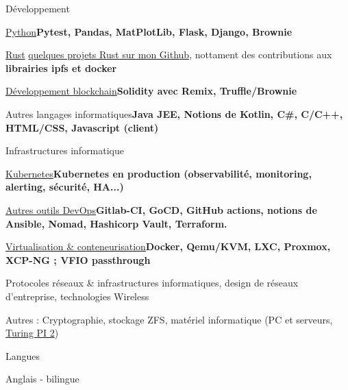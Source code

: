 \begin{cventries}
  \cventry
    {} %
    {Développement} %
    {} %
    {} %
    {
      \begin{cvitems} %
        \item {\underline{Python}\hspace{4.8cm}\textbf{Pytest, Pandas, MatPlotLib, Flask, Django, Brownie}}
        \item {\underline{Rust} \hspace{5.1cm}\href{https://github.com/guillheu?tab=repositories&q=&type=&language=rust&sort=}{quelques projets Rust sur mon Github}, nottament des contributions aux \textbf{librairies ipfs et docker}}
        \item {\underline{Développement blockchain}\hspace{2.2cm}\textbf{Solidity avec Remix, Truffle/Brownie}}
        \item {Autres langages informatiques\hspace{1.85cm}\textbf{Java JEE, Notions de Kotlin, C\#, C/C++, HTML/CSS, Javascript (client)}\\}
      \end{cvitems}
    }
  \cventry
    {} %
    {Infrastructures informatique} %
    {} %
    {} %
    {
      \begin{cvitems} %
        \item {\underline{Kubernetes}\hspace{4.2cm}\textbf{Kubernetes en production (observabilité, monitoring, alerting, sécurité, HA...)}}
        \item {\underline{Autres outils DevOps}\hspace{3.02cm}\textbf{Gitlab-CI, GoCD, GitHub actions, notions de Ansible, Nomad, Hashicorp Vault, Terraform.}}
        \item {\underline{Virtualisation \& conteneurisation}\hspace{1.5cm}\textbf{Docker, Qemu/KVM, LXC, Proxmox, XCP-NG ; VFIO passthrough}}
        \item {Protocoles réseaux \& infrastructures informatiques, design de réseaux d'entreprise, technologies Wireless}
        \item {Autres : Cryptographie, stockage ZFS, matériel informatique (PC et serveurs, \href{https://turingpi.com/}{Turing PI 2})\\}
      \end{cvitems}
    }
  \cventry
    {} %
    {Langues} %
    {} %
    {} %
    {
      \begin{cvitems} %
        \item {Anglais - bilingue}
      \end{cvitems}
    }
\end{cventries}